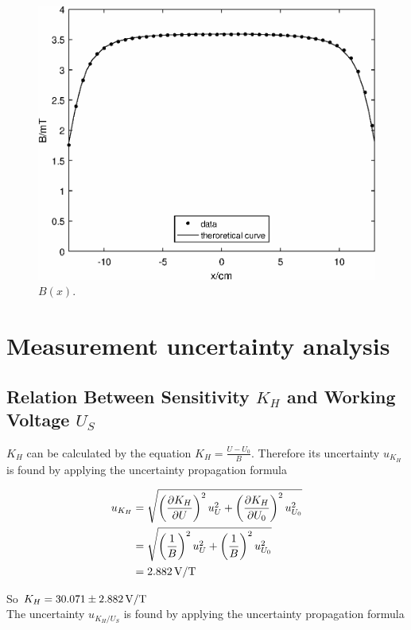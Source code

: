 \documentclass{article}
\begin{document}
\begin{figure}[H]
	\centering
	\includegraphics[scale=0.6]{fig3.eps}
	\caption{$B(x)$.}
	\label{fig-3}
\end{figure}

\newpage

\section{Measurement uncertainty analysis}

\subsection{Relation Between Sensitivity $ K_H $ and Working Voltage $ U_S $}

$K_H$ can be calculated by the equation $K_H=\frac{U-U_0}{B}$. Therefore its uncertainty $u_{K_H}$ is found by applying the uncertainty propagation formula

\begin{align*}
u_{K_H}&=\sqrt{\left(\frac{\partial K_H}{\partial U}\right)^2u_U^2+\left(\frac{\partial K_H}{\partial U_0}\right)^2u_{U_0}^2}\\
&=\sqrt{\left(\frac{1}{B}\right)^2u_U^2+\left(\frac{1}{B}\right)^2u_{U_0}^2}\\
&=2.882\,\rm{V/T}
\end{align*}

So $K_H=30.071\pm2.882\,\rm{V/T}$\\

The uncertainty $u_{K_H/U_S}$ is found by applying the uncertainty propagation formula
\end{document}

